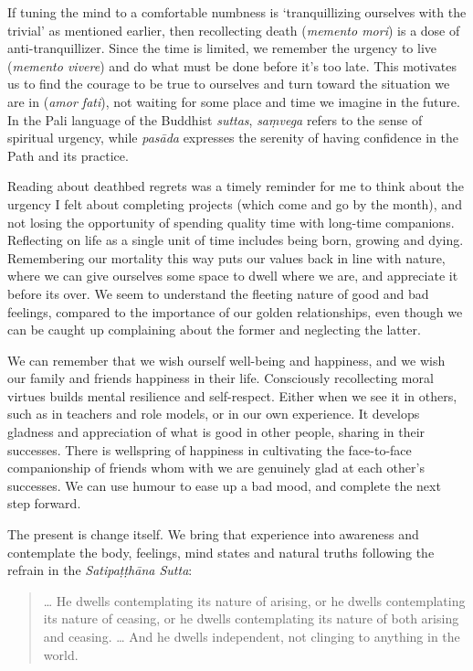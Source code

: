 
If tuning the mind to a comfortable numbness is `tranquillizing
ourselves with the trivial' as mentioned earlier, then recollecting
death (\emph{memento mori}) is a dose of anti-tranquillizer. Since the
time is limited, we remember the urgency to live (\emph{memento vivere})
and do what must be done before it's too late. This motivates us to find
the courage to be true to ourselves and turn toward the situation we are
in (\emph{amor fati}), not waiting for some place and time we imagine in
the future. In the Pali language of the Buddhist \emph{suttas},
\emph{saṃvega} refers to the sense of spiritual urgency, while
\emph{pasāda} expresses the serenity of having confidence in the Path
and its practice.

Reading about deathbed regrets was a timely reminder for me to think
about the urgency I felt about completing projects (which come and go by
the month), and not losing the opportunity of spending quality time with
long-time companions. Reflecting on life as a single unit of time
includes being born, growing and dying. Remembering our mortality this
way puts our values back in line with nature, where we can give
ourselves some space to dwell where we are, and appreciate it before its
over. We seem to understand the fleeting nature of good and bad
feelings, compared to the importance of our golden relationships, even
though we can be caught up complaining about the former and neglecting
the latter.

We can remember that we wish ourself well-being and happiness, and we
wish our family and friends happiness in their life. Consciously
recollecting moral virtues builds mental resilience and self-respect.
Either when we see it in others, such as in teachers and role models, or
in our own experience. It develops gladness and appreciation of what is
good in other people, sharing in their successes. There is wellspring of
happiness in cultivating the face-to-face companionship of friends whom
with we are genuinely glad at each other's successes. We can use humour
to ease up a bad mood, and complete the next step forward.

The present is change itself. We bring that experience into awareness
and contemplate the body, feelings, mind states and natural truths
following the refrain in the \emph{Satipaṭṭhāna Sutta}:

\begin{quote}
\ldots{} He dwells contemplating its nature of arising, or he dwells
contemplating its nature of ceasing, or he dwells contemplating its
nature of both arising and ceasing. \ldots{} And he dwells independent,
not clinging to anything in the world.

\bigskip

\end{quote}
